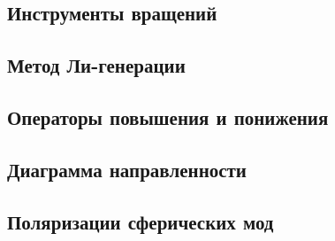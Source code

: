 \documentclass[\docroot/reports/draft/report.tex]{subfiles}
\begin{document}
\onlyinsubfile{\tableofcontents}

\subsection{Инструменты вращений}


\subsection{Метод Ли-генерации}


\subsection{Операторы повышения и понижения}


\subsection{Диаграмма направленности}


\subsection{Поляризации сферических мод}



\end{document}
